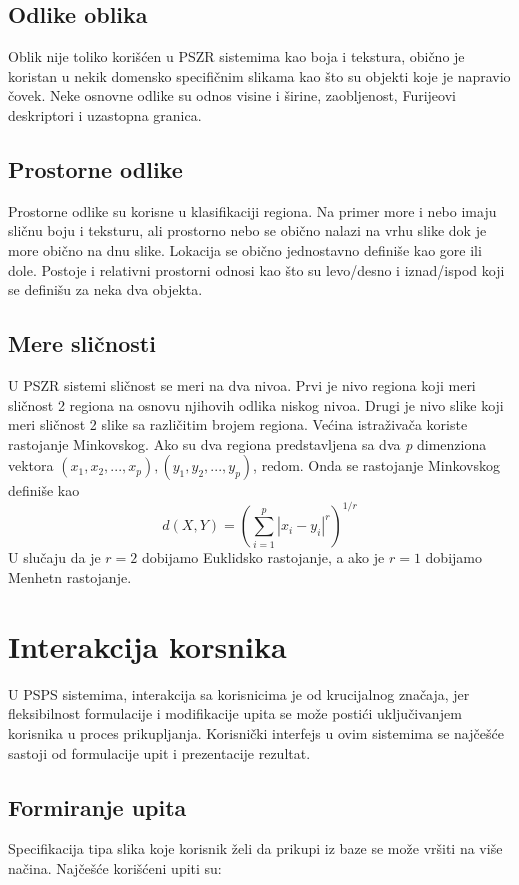 \documentclass{article}
\begin{document}
\subsection{Odlike oblika}
Oblik nije toliko korišćen u PSZR sistemima kao boja i tekstura, obično je koristan u nekik domensko specifičnim slikama kao što su objekti koje je napravio čovek. Neke osnovne odlike su odnos visine i širine, zaobljenost, Furijeovi deskriptori i uzastopna granica.

\subsection{Prostorne odlike}
Prostorne odlike su korisne u klasifikaciji regiona. Na primer more i nebo imaju sličnu boju i teksturu, ali prostorno nebo se obično nalazi na vrhu slike dok je more obično na dnu slike. Lokacija se obično jednostavno definiše kao gore ili dole. Postoje i relativni prostorni odnosi kao što su levo/desno i iznad/ispod koji se definišu za neka dva objekta.

\subsection{Mere sličnosti}
U PSZR sistemi sličnost se meri na dva nivoa. Prvi je nivo regiona koji meri sličnost 2 regiona na osnovu njihovih odlika niskog nivoa. Drugi je nivo slike koji meri sličnost 2 slike sa različitim brojem regiona. Većina istraživača koriste rastojanje Minkovskog. Ako su dva regiona predstavljena sa dva \textit{p} dimenziona vektora \textit{$(x_{1},x_{2},...,x_{p}), (y_{1},y_{2},...,y_{p})$}, redom. Onda se rastojanje Minkovskog definiše kao
$$ d(X,Y) = (\sum_{i=1}^{p} {|x_{i}-y_{i}|}^{r})^{1/r} $$
U slučaju da je $r=2$ dobijamo Euklidsko rastojanje, a ako je $r=1$ dobijamo Menhetn rastojanje.

\section{Interakcija korsnika}
U PSPS sistemima, interakcija sa korisnicima je od krucijalnog značaja, jer fleksibilnost formulacije i modifikacije upita se može postići uključivanjem korisnika u proces prikupljanja. Korisnički interfejs u ovim sistemima se najčešće sastoji od formulacije upit i prezentacije rezultat.

\subsection{Formiranje upita}
Specifikacija tipa slika koje korisnik želi da prikupi iz baze se može vršiti na više načina. Najčešće korišćeni upiti su:
\end{document}
